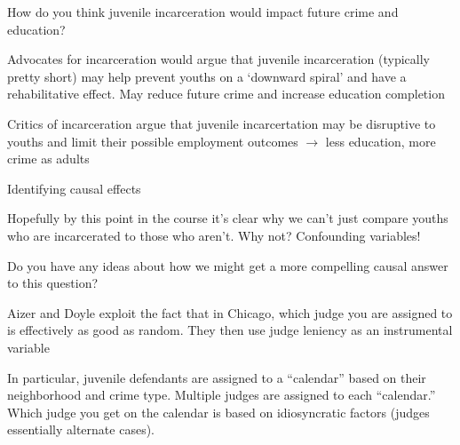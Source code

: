\documentclass[11pt,english,handout]{beamer}
\newenvironment{wideitemize}{\itemize\addtolength{\itemsep}{10pt}}{\enditemize}
\begin{document}
\begin{frame}{How do you think juvenile incarceration would impact future crime and education?}
		\begin{wideitemize}	
			\pause
			\item
			Advocates for incarceration would argue that juvenile incarceration (typically pretty short) may help prevent youths on a `downward spiral' and have a rehabilitative effect. May reduce future crime and increase education completion
			
			\item
			Critics of incarceration argue that juvenile incarcertation may be disruptive to youths and limit their possible employment outcomes $\rightarrow$ less education, more crime as adults	
		\end{wideitemize}
		
\end{frame}

\begin{frame}{Identifying causal effects}

\begin{wideitemize}
	\item
	Hopefully by this point in the course it's clear why we can't just compare youths who are incarcerated to those who aren't. Why not? \pause{} Confounding variables!
	
	\item
	Do you have any ideas about how we might get a more compelling causal answer to this question? 
	
	\pause
	\item
	Aizer and Doyle exploit the fact that in Chicago, which judge you are assigned to is effectively as good as random. They then use judge leniency as an instrumental variable
	
	\pause
	\item
	In particular, juvenile defendants are assigned to a ``calendar'' based on their neighborhood and crime type. Multiple judges are assigned to each ``calendar.'' Which judge you get on the calendar is based on idiosyncratic factors (judges essentially alternate cases).
\end{wideitemize}

\end{frame}
\end{document}
